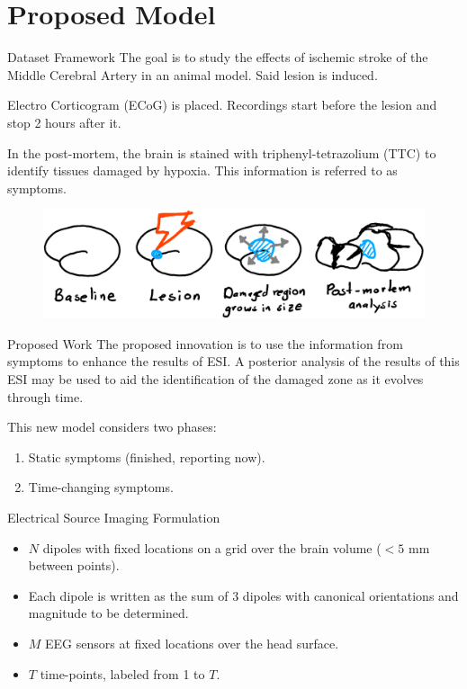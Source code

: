 \documentclass[progressbar=head]{beamer}
\begin{document}
{
\section{Proposed Model}
}

\begin{frame}{Dataset Framework}
The goal is to study the effects of
ischemic stroke of the Middle Cerebral Artery in an animal
model. 
Said lesion is induced.

Electro Corticogram (ECoG) is placed. Recordings start before the lesion and stop 2 hours after it.

In the post-mortem, the brain is stained with
triphenyl-tetrazolium (TTC)
to identify tissues damaged by hypoxia. This information is referred to as \alert{symptoms}.

\begin{figure}
\centering
\includegraphics[width=0.8\linewidth]{./img_oldbeamer/sketch01_v2}
\end{figure}
\end{frame}

\begin{frame}{Proposed Work}
The proposed innovation is to use the information from {symptoms} to enhance the results of ESI.
%
A posterior analysis of the results of this ESI may be used to aid the identification of the damaged zone as it evolves through time.

This new model considers two phases:
\begin{enumerate}
    \item Static symptoms (finished, reporting now).
    \item Time-changing symptoms.
\end{enumerate}
\end{frame}



\begin{frame}{Electrical Source Imaging Formulation}
\begin{itemize}
    \item $N$ dipoles with fixed locations on a grid over the brain volume ($<5$ mm between points).
    \item Each dipole is written as the sum of 3 dipoles with canonical orientations and magnitude to be determined.
    \item $M$ EEG sensors at fixed locations over the head surface.
    \item $T$ time-points, labeled from 1 to $T$.
\end{itemize}
\end{frame}
\end{document}
